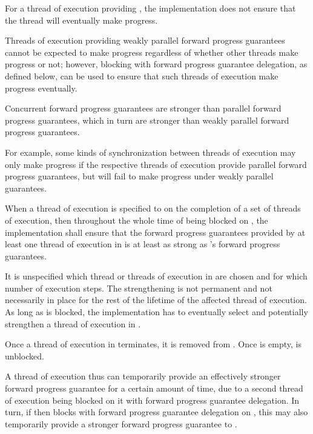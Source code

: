 \pnum
{}%
For a thread of execution providing , the implementation does not ensure that the thread will eventually
make progress.

\pnum
\begin{note}
Threads of execution providing weakly parallel forward progress guarantees cannot
be expected to make progress regardless of whether other threads make progress or
not; however, blocking with forward progress guarantee delegation, as defined below,
can be used to ensure that such threads of execution make progress eventually.
\end{note}

\pnum
Concurrent forward progress guarantees are stronger than parallel forward progress
guarantees, which in turn are stronger than weakly parallel forward progress
guarantees.
\begin{note}
For example, some kinds of synchronization between threads of execution may only
make progress if the respective threads of execution provide parallel forward progress
guarantees, but will fail to make progress under weakly parallel guarantees.
\end{note}

\pnum
{}%
When a thread of execution  is specified to  on the completion of a set  of threads
of execution, then throughout the whole time of  being blocked on
, the implementation shall ensure that the forward progress guarantees
provided by at least one thread of execution in  is at least as strong
as 's forward progress guarantees.
\begin{note}
It is unspecified which thread or threads of execution in  are chosen
and for which number of execution steps. The strengthening is not permanent and
not necessarily in place for the rest of the lifetime of the affected thread of
execution. As long as  is blocked, the implementation has to eventually
select and potentially strengthen a thread of execution in .
\end{note}
Once a thread of execution in  terminates, it is removed from .
Once  is empty,  is unblocked.

\pnum
\begin{note}
A thread of execution  thus can temporarily provide an effectively
stronger forward progress guarantee for a certain amount of time, due to a
second thread of execution  being blocked on it with forward
progress guarantee delegation. In turn, if  then blocks with
forward progress guarantee delegation on , this may also temporarily
provide a stronger forward progress guarantee to .
\end{note}

